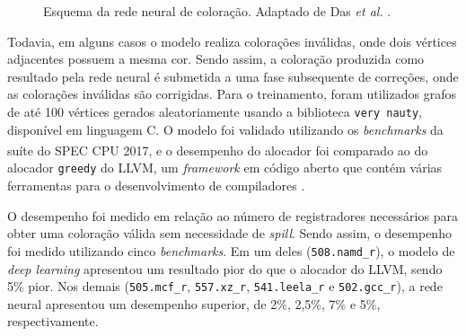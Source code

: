 \documentclass[
	12pt,				%
	openright,			%
	twoside,			%
	a4paper,			%
	tcc,			%
	]{ABNT-DC-UEL}
\begin{document}
\begin{figure}[hbt]
{
    }
    \caption{Esquema da rede neural de coloração. Adaptado de Das \textit{et al.} \cite{das:20}.}
    \label{fig:das-modelo}
\end{figure}

Todavia, em alguns casos o modelo realiza colorações inválidas, onde dois vértices adjacentes possuem a mesma cor. Sendo assim, a coloração produzida como resultado pela rede neural é submetida a uma fase subsequente de correções, onde as colorações inválidas são corrigidas. Para o treinamento, foram utilizados grafos de até 100 vértices gerados aleatoriamente usando a biblioteca \texttt{very nauty}, disponível em linguagem C. O modelo foi validado utilizando os \textit{benchmarks} da suíte do SPEC CPU\textsuperscript{\textregistered} 2017, e o desempenho do alocador foi comparado ao do alocador \texttt{greedy} do LLVM, um \textit{framework} em código aberto que contém várias ferramentas para o desenvolvimento de compiladores 
\cite{lattner:04}. 

O desempenho foi medido em relação ao número de registradores necessários para obter uma coloração válida sem necessidade de \textit{spill}. Sendo assim, o desempenho foi medido utilizando cinco \textit{benchmarks}. Em um deles (\texttt{508.namd\_r}), o modelo de \textit{deep learning} apresentou um resultado pior do que o alocador do LLVM, sendo 5\% pior. Nos demais (\texttt{505.mcf\_r}, \texttt{557.xz\_r}, \texttt{541.leela\_r} e \texttt{502.gcc\_r}), a rede neural apresentou um desempenho superior, de 2\%, 2,5\%, 7\% e 5\%, respectivamente.
\end{document}

